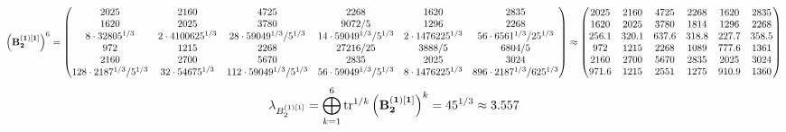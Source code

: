 \documentclass[10pt,a4paper]{article}
\begin{document}
	\[
		\left(\bold{B_2^{(1)[1]}}\right)^{6} = 
		\begin{pmatrix}
			{{2025}}{} & {{2160}}{} & {{4725}}{} & {{2268}}{} & {{1620}}{} & {{2835}}{} \\
			{{1620}}{} & {{2025}}{} & {{3780}}{} & {{9072}} / {{5}} & {{1296}}{} & {{2268}}{} \\
			{{8} \cdot {32805^ {1 / 3}}}{} & {{2} \cdot {4100625^ {1 / 3}}}{} & {{28} \cdot {59049^ {1 / 3}}} / {{5^ {1 / 3}}} & {{14} \cdot {59049^ {1 / 3}}} / {{5^ {1 / 3}}} & {{2} \cdot {1476225^ {1 / 3}}}{} & {{56} \cdot {6561^ {1 / 3}}} / {{25^ {1 / 3}}} \\
			{{972}}{} & {{1215}}{} & {{2268}}{} & {{27216}} / {{25}} & {{3888}} / {{5}} & {{6804}} / {{5}} \\
			{{2160}}{} & {{2700}}{} & {{5670}}{} & {{2835}}{} & {{2025}}{} & {{3024}}{} \\
			{{128} \cdot {2187^ {1 / 3}}} / {{5^ {1 / 3}}} & {{32} \cdot {54675^ {1 / 3}}}{} & {{112} \cdot {59049^ {1 / 3}}} / {{5^ {1 / 3}}} & {{56} \cdot {59049^ {1 / 3}}} / {{5^ {1 / 3}}} & {{8} \cdot {1476225^ {1 / 3}}}{} & {{896} \cdot {2187^ {1 / 3}}} / {{625^ {1 / 3}}} \\
		\end{pmatrix}
		\approx
		\begin{pmatrix}
			2025     & 2160     & 4725     & 2268     & 1620     & 2835     \\
			1620     & 2025     & 3780     & 1814     & 1296     & 2268     \\
			256.1    & 320.1    & 637.6    & 318.8    & 227.7    & 358.5    \\
			972      & 1215     & 2268     & 1089     & 777.6    & 1361     \\
			2160     & 2700     & 5670     & 2835     & 2025     & 3024     \\
			971.6    & 1215     & 2551     & 1275     & 910.9    & 1360     \\
		\end{pmatrix}
	\]
	\[
		\lambda_{B_2^{(1)[1]}} =  \bigoplus ^{6} _{k = 1} \operatorname{tr} ^{1 / k} \left( \bold{B_2^{(1)[1]}} \right)^k = {{45^ {1 / 3}}}{}\approx 3.557
	\]
\end{document}
